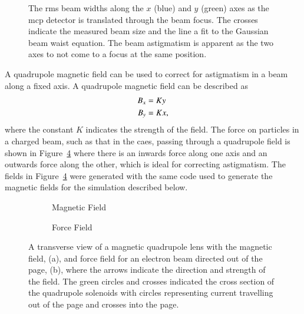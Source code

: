 \begin{figure}
    \centering
    
    \caption[Electron beam astigmatism.]{The \gls{rms} beam widths along the $x$ (blue) and $y$ (green) axes as the \gls{mcp} detector is translated through the beam focus.
    The crosses indicate the measured beam size and the line a fit to the Gaussian beam waist equation.
    The beam astigmatism is apparent as the two axes to not come to a focus at the same position.}
    \label{figure:astigmatism_translation}
\end{figure}

A quadrupole magnetic field can be used to correct for astigmatism in a beam along a fixed axis.
A quadrupole magnetic field can be described as
\begin{align}
B_x &= K y \notag\\
B_y &= K x,
\end{align}
where the constant $K$ indicates the strength of the field.
The force on particles in a charged beam, such as that in the \gls{caes}, passing through a quadrupole field is shown in Figure~\ref{figure:quadrupole_example} where there is an inwards force along one axis and an outwards force along the other, which is ideal for correcting astigmatism.
The fields in Figure~\ref{figure:quadrupole_example} were generated with the same code used to generate the magnetic fields for the simulation described below.

\begin{figure}
    \centering
    \begin{subfigure}{0.49\linewidth}
    \centering
    
    \caption{Magnetic Field}
    \label{figure:quadrupole_example_field}
    \end{subfigure}
    \begin{subfigure}{0.49\linewidth}
    \centering
    
    \caption{Force Field}
    \label{figure:quadrupole_example_force}
    \end{subfigure}
    \caption[Quadrupole magnetic and force fields.]{A transverse view of a magnetic quadrupole lens with the magnetic field, (a), and force field for an electron beam directed out of the page, (b), where the arrows indicate the direction and strength of the field.
    The green circles and crosses indicated the cross section of the quadrupole solenoids with circles representing current travelling out of the page and crosses into the page.}
    \label{figure:quadrupole_example}
\end{figure}

